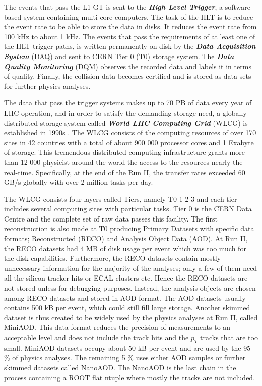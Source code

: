 The events that pass the L1 GT is sent to the \emph{\textbf{High Level Trigger}}, a software-based system containing multi-core computers. The task of the HLT is to reduce the event rate to be able to store the data in disks. It reduces the event rate from 100 kHz to about 1 kHz. The events that pass the requirements of at least one of the HLT trigger paths, is written permanently on disk by the \emph{\textbf{Data Acquisition System}} (DAQ) and sent to CERN Tier 0 (T0) storage system. The \emph{\textbf{Data Quality Monitoring}} (DQM) observes the recorded data and labels it in terms of quality. Finally, the collision data becomes certified and is stored as data-sets for further physics analyses.

The data that pass the trigger systems makes up to 70 PB of data every year of LHC operation, and in order to satisfy the demanding storage need, a globally distributed storage system called \emph{\textbf{World LHC Computing Grid}} (WLCG) is established in 1990s \cite{Bayatyan:838359}. The WLCG consists of the computing resources of over 170 sites in 42 countries with a total of about 900 000 processor cores and 1 Exabyte of storage. This tremendous distributed computing infrastructure grants more than 12 000 physicist around the world the access to the resources nearly the real-time. Specifically, at the end of the Run II, the transfer rates exceeded 60 GB/s globally with over 2 million tasks per day.

The WLCG consists four layers called Tiers, namely T0-1-2-3 and each tier includes several computing sites with particular tasks. Tier 0 is the CERN Data Centre and the complete set of raw data passes this facility. The first reconstruction is also made at T0 producing Primary Datasets with specific data formats; Reconstructed (RECO) and Analysis Object Data (AOD). At Run II, the RECO datasets had 4 MB of disk usage per event which was too much for the disk capabilities. Furthermore, the RECO datasets contain mostly unnecessary information for the majority of the analyses; only a few of them need all the silicon tracker hits or ECAL clusters etc. Hence the RECO datasets are not stored unless for debugging purposes. Instead, the analysis objects are chosen among RECO datasets and stored in AOD format. The AOD datasets usually contains 500 kB per event, which could still fill large storage. Another skimmed dataset is thus created to be widely used by the physics analyses at Run II, called MiniAOD. This data format reduces the precision of measurements to an acceptable level and does not include the track hits and the $p_T$ tracks that are too small. MiniAOD datasets occupy about 50 kB per event and are used by the 95 \% of physics analyses. The remaining 5 \% uses either AOD samples or further skimmed datasets called NanoAOD. The NanoAOD is the last chain in the process containing a ROOT flat ntuple where mostly the tracks are not included.

